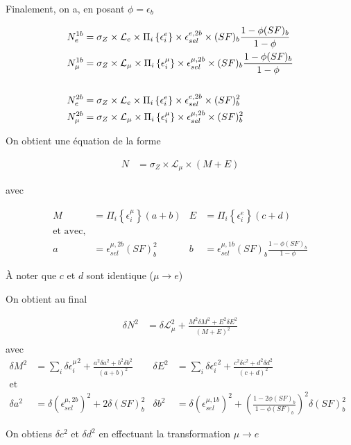 \documentclass[a4paper,11pt]{article}
\begin{document}
Finalement, on a, en posant $\phi = \epsilon_b$

\begin{align}
  N_e^{1b} &= \sigma_Z \times \mathcal{L}_e \times \Pi_i \left\{ \epsilon_i^{e} \right\} \times \epsilon_{sel}^{e, 2b} \times (SF)_b\frac{1 - \phi (SF)_b}{1 - \phi} \\
  N_\mu^{1b} &= \sigma_Z \times \mathcal{L}_\mu \times \Pi_i \left\{ \epsilon_i^{\mu} \right\} \times \epsilon_{sel}^{\mu, 2b} \times (SF)_b\frac{1 - \phi (SF)_b}{1 - \phi} \\
  \notag \\
  N_e^{2b} &= \sigma_Z \times \mathcal{L}_e \times \Pi_i \left\{ \epsilon_i^{e} \right\} \times \epsilon_{sel}^{e, 2b} \times (SF)_b^2 \\
  N_\mu^{2b} &= \sigma_Z \times \mathcal{L}_\mu \times \Pi_i \left\{ \epsilon_i^{\mu} \right\} \times \epsilon_{sel}^{\mu, 2b} \times (SF)_b^2
\end{align}

On obtient une équation de la forme

\begin{align}
  N &= \sigma_Z \times \mathcal{L}_\mu \times \left( M + E \right)
\end{align}

avec

\begin{align}
  M &= \Pi_i \left\{ \epsilon_i^{\mu} \right\} \left( a + b \right) & 
  E &= \Pi_i \left\{ \epsilon_i^{e} \right\} \left( c + d \right) \\
  \text{et avec,} \\
  a &= \epsilon_{sel}^{\mu, 2b} (SF)_b^2 & b &= \epsilon_{sel}^{\mu, 1b} (SF)_b\frac{1 - \phi (SF)_b}{1 - \phi}
\end{align}

À noter que $c$ et $d$ sont identique ($\mu \rightarrow e$)

On obtient au final

\begin{align}
  \delta N^2 &= \delta \mathcal{L}_\mu^2 + \frac{M^2 \delta M^2 + E^2 \delta E^2}{\left(M + E\right)^2}\\
\end{align}
avec 
\begin{align}
  \delta M^2 &= \sum_i{\delta {\epsilon_i^{\mu}}^2} + \frac{a^2 \delta a^2 + b^2 \delta b^2}{\left(a + b\right)^2} &
  \delta E^2 &= \sum_i{\delta {\epsilon_i^{e}}^2} + \frac{c^2 \delta c^2 + d^2 \delta d^2}{\left(c + d\right)^2} \\
  \text{et}\\
  \delta a^2 &= \delta \left( \epsilon_{sel}^{\mu, 2b} \right)^2 + 2\delta(SF)_b^2 &
  \delta b^2 &= \delta \left( \epsilon_{sel}^{\mu, 1b} \right)^2 + \left( \frac{1 - 2\phi (SF)_b}{1 - \phi (SF)_b} \right)^2 \delta(SF)_b^2 &
\end{align}

On obtiens $\delta c^2$ et $\delta d^2$ en effectuant la transformation $\mu \rightarrow e$
\end{document}
